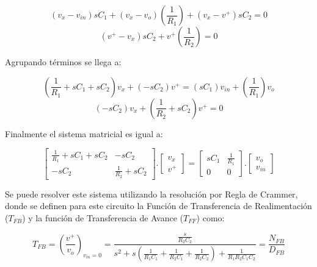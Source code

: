 \documentclass[12pt,a4paper]{article}
\begin{document}
\begin{equation}
    \label{eq_28}
    (v_{x} - v_{in})sC_{1} + (v_{x} - v_{o})\left(\frac{1}{R_{1}}\right) + (v_{x} - v^{+})sC_{2} = 0
\end{equation}
\begin{equation}
    \label{eq_29}
    (v^{+} - v_{x})sC_{2} + v^{+}\left(\frac{1}{R_{2}}\right) = 0
\end{equation}

Agrupando términos se llega a:

\begin{equation}
    \label{eq_30}
    \left(\frac{1}{R_{1}} + sC_{1} + sC_{2}\right)v_{x} + (-sC_{2})v^{+} = (sC_1)v_{in} + \left(\frac{1}{R_1}\right)v_{o}
\end{equation}
\begin{equation}
    \label{eq_31}
    (-sC_2)v_x + \left(\frac{1}{R_2} + sC_2\right)v^{+} = 0
\end{equation}

Finalmente el sistema matricial es igual a:

\begin{equation}
    \label{eq_32}
    \begin{bmatrix}
        \frac{1}{R_{1}} + sC_{1} + sC_{2}  & -sC_{2} \\
        -sC_{2} & \frac{1}{R_2} + sC_2    
    \end{bmatrix} . 
    \begin{bmatrix}
        v_x \\
        v^+
    \end{bmatrix} =
    \begin{bmatrix}
        sC_1 & \frac{1}{R_1} \\
        0 & 0
    \end{bmatrix} . 
    \begin{bmatrix}
        v_o \\
        v_{in}
    \end{bmatrix}
\end{equation}

Se puede resolver este sistema utilizando la resolución por Regla de Crammer, donde se definen para este circuito la Función de Transferencia de Realimentación ($T_{FB}$) y la función de Transferencia de Avance ($T_{FF}$) como:

\begin{equation}
    \label{eq_33}
    T_{FB} = \left(\frac{v^+}{v_{o}}\right)_{v_{in} = 0} = \frac{\frac{s}{R_{2}C_{2}}}{s^2 + s\left(\frac{1}{R_{1}C_{1}} + \frac{1}{R_{2}C_{1}} + \frac{1}{R_{2}C_{2}}\right) + \frac{1}{R_{1}R_{2}C_{1}C_{2}}}= \frac{N_{FB}}{D_{FB}}
\end{equation}
\end{document}
